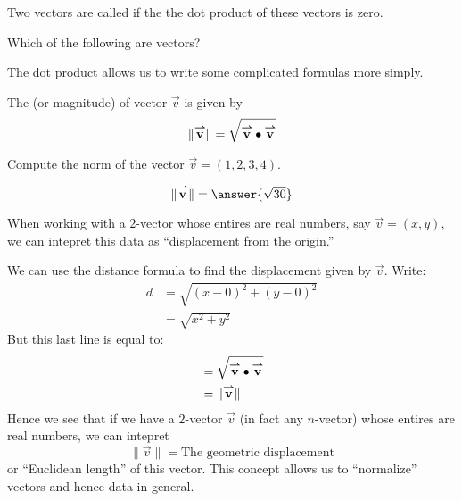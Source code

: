 \documentclass{ximera}
\begin{document}
\begin{definition}
  Two vectors are called  if the the dot product of
  these vectors is zero.
\end{definition}



\begin{question}
  Which of the following are vectors?
  \begin{selectAll}
    \end{selectAll}
\end{question}

The dot product allows us to write some complicated formulas more simply.
 
\begin{definition}
  The  (or magnitude) of vector $\vec{v}$ is given by
  \[
  \|{\overset{\boldsymbol{\rightharpoonup}}{\mathbf{v}}}\hspace{0in}\|=\sqrt{{\overset{\boldsymbol{\rightharpoonup}}{\mathbf{v}}}\hspace{0in}\bullet{\overset{\boldsymbol{\rightharpoonup}}{\mathbf{v}}}\hspace{0in}}
  \]
\end{definition}

\begin{question}
  Compute the norm of the vector $\vec{v} = (1,2,3,4)$.
  \begin{prompt}
    \[
    \|\vec{v}\| = \answer{\sqrt{30}}
    \]
  \end{prompt}
\end{question}
When working with a $2$-vector whose entires are real numbers, say
$\vec{v} = (x,y)$, we can intepret this data as ``displacement from
the origin.''
\begin{center}
\end{center}
We can use the distance formula to find the displacement given by
$\vec{v}$. Write:
\begin{align*}
  d &= \sqrt{\left(x-0\right)^{2} + \left(y-0\right)^{2}}\\
  &= \sqrt{x^{2} + y^{2}}
\end{align*}
But this last line is equal to:
\begin{align*}
  &= \sqrt{{\overset{\boldsymbol{\rightharpoonup}}{\mathbf{v}}}\hspace{0in}\bullet{\overset{\boldsymbol{\rightharpoonup}}{\mathbf{v}}}\hspace{0in}}\\
  &= \|{\overset{\boldsymbol{\rightharpoonup}}{\mathbf{v}}}\hspace{0in}\|
\end{align*}
Hence we see that if we have a $2$-vector $\vec{v}$ (in fact any
$n$-vector) whose entires are real numbers, we can intepret
\[
\|\vec{v}\| = \text{The geometric displacement} 
\]
or ``Euclidean length'' of this vector. This concept allows us to
``normalize'' vectors and hence data in general.
\end{document}
